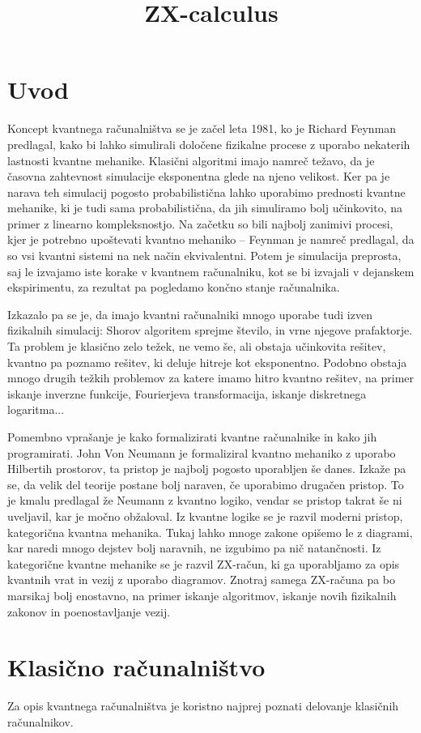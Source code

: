\documentclass[mat1]{fmfdelo}
\title{ZX-calculus}
\begin{document}
\section{Uvod}
Koncept kvantnega računalništva se je začel leta 1981, ko je Richard Feynman predlagal, kako bi lahko simulirali določene fizikalne procese z uporabo nekaterih lastnosti kvantne mehanike\cite{feynmann}. Klasični algoritmi imajo namreč težavo, da je časovna zahtevnost simulacije eksponentna glede na njeno velikost. Ker pa je narava teh simulacij pogosto probabilistična lahko uporabimo prednosti kvantne mehanike, ki je tudi sama probabilistična, da jih simuliramo bolj učinkovito, na primer z linearno kompleksnostjo. Na začetku so bili najbolj zanimivi procesi, kjer je potrebno upoštevati kvantno mehaniko -- Feynman je namreč predlagal, da so vsi kvantni sistemi na nek način ekvivalentni. Potem je simulacija preprosta, saj le izvajamo iste korake v kvantnem računalniku, kot se bi izvajali v dejanskem ekspirimentu, za rezultat pa pogledamo končno stanje računalnika.

Izkazalo pa se je, da imajo kvantni računalniki mnogo uporabe tudi izven fizikalnih simulacij: Shorov algoritem sprejme število, in vrne njegove prafaktorje. Ta problem je klasično zelo težek, ne vemo še, ali obstaja učinkovita rešitev, kvantno pa poznamo rešitev, ki deluje hitreje kot eksponentno. Podobno obstaja mnogo drugih težkih problemov za katere imamo hitro kvantno rešitev, na primer iskanje inverzne funkcije, Fourierjeva transformacija, iskanje diskretnega logaritma...

Pomembno vprašanje je kako formalizirati kvantne računalnike in kako jih programirati. John Von Neumann je formaliziral kvantno mehaniko z uporabo Hilbertih prostorov, ta pristop je najbolj pogosto uporabljen še danes\cite{neumann}. Izkaže pa se, da velik del teorije postane bolj naraven, če uporabimo drugačen pristop. To je kmalu predlagal že Neumann z kvantno logiko, vendar se pristop takrat še ni uveljavil, kar je močno obžaloval. Iz kvantne logike se je razvil moderni pristop, kategorična kvantna mehanika. Tukaj lahko mnoge zakone opišemo le z diagrami, kar naredi mnogo dejstev bolj naravnih, ne izgubimo pa nič natančnosti. Iz kategorične kvantne mehanike se je razvil ZX-račun, ki ga uporabljamo za opis kvantnih vrat in vezij z uporabo diagramov. Znotraj samega ZX-računa pa bo marsikaj bolj enostavno, na primer iskanje algoritmov, iskanje novih fizikalnih zakonov in poenostavljanje vezij.

\section{Klasično računalništvo}
Za opis kvantnega računalništva je koristno najprej poznati delovanje klasičnih računalnikov. 
\end{document}
